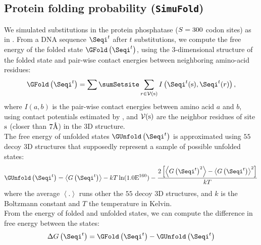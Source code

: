 \documentclass{article}
\begin{document}
	\subsection{Protein folding probability (\texttt{SimuFold})}
	\label{subsec:protein-folding-probability}

	We simulated substitutions in the protein phosphatase ($S=300$ {codon} sites) as in \citet{Goldstein2017}.
	From a {DNA} sequence $\Seqi^t$ after $t$ substitutions, we compute the free energy of the folded state $ \GFold \left(\Seqi^{t}\right)$, using the 3-dimensional structure of the folded state and pair-wise contact energies between neighboring amino-acid residues:
	\begin{equation}
		\GFold \left(\Seqi^{t}\right) = \sum\limits\sumSetsite \sum\limits_{r \in \mathcal{V}(\site)} I \left(\Seqi^t(\site), \Seqi^t(r) \right),
	\end{equation}
	where $I(a,b)$ is the pair-wise contact energies between amino acid $a$ and $b$, using contact potentials estimated by \citet{Miyazawa1985}, and $\mathcal{V}(\text{s})$ are the neighbor residues of site $\text{s}$ (closer than $7\text{\normalfont\AA}$) in the 3D structure.\\

	The free energy of unfolded states $\GUnfold \left(\Seqi^{t}\right)$ is approximated using $55$ decoy 3D structures that supposedly represent a sample of possible unfolded states:
	\begin{equation}
		\GUnfold \left(\Seqi^{t}\right) = \left\langle G\left(\Seqi^{t}\right) \right\rangle - kT \ln (1.0\text{E}^{160}) - \dfrac{2 \left[ \left\langle G\left(\Seqi^{t}\right)^2 \right\rangle - \left\langle G\left(\Seqi^{t}\right) \right\rangle^2\right] }{kT}
	\end{equation}
	where the average $\left\langle . \right\rangle$ runs other the $55$ decoy 3D structures, and $k$ is the Boltzmann constant and $T$ the temperature in Kelvin.\\

	From the energy of folded and unfolded states, we can compute the difference in free energy between the states:
	\begin{equation}
		\phenoFold\left(\Seqi^{t}\right) = \GFold \left(\Seqi^{t}\right) - \GUnfold \left(\Seqi^{t}\right)
	\end{equation}
\end{document}
